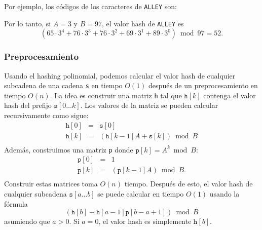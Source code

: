 Por ejemplo, los códigos de los caracteres
de \texttt{ALLEY} son:
\begin{center}
\end{center}

Por lo tanto, si $A=3$ y $B=97$, el valor hash
de \texttt{ALLEY} es
\[(65 \cdot 3^4 + 76 \cdot 3^3 + 76 \cdot 3^2 + 69 \cdot 3^1 + 89 \cdot 3^0) \bmod 97 = 52.\]

\subsubsection*{Preprocesamiento}

Usando el hashing polinomial, podemos calcular el valor hash de cualquier subcadena
de una cadena \texttt{s} en tiempo $O(1)$ después de un preprocesamiento en tiempo $O(n)$.
La idea es construir una matriz \texttt{h} tal que
$\texttt{h}[k]$ contenga el valor hash del prefijo $\texttt{s}[0 \ldots k]$.
Los valores de la matriz se pueden calcular recursivamente como sigue:
\[
\begin{array}{lcl}
\texttt{h}[0] & = & \texttt{s}[0] \\
\texttt{h}[k] & = & (\texttt{h}[k-1] A + \texttt{s}[k]) \bmod B \\
\end{array}
\]
Además, construimos una matriz \texttt{p}
donde $\texttt{p}[k]=A^k \bmod B$:
\[
\begin{array}{lcl}
\texttt{p}[0] & = & 1 \\
\texttt{p}[k] & = & (\texttt{p}[k-1] A) \bmod B. \\
\end{array}
\]
Construir estas matrices toma $O(n)$ tiempo.
Después de esto, el valor hash de cualquier subcadena
$\texttt{s}[a \ldots b]$
se puede calcular en tiempo $O(1)$ usando la fórmula
\[(\texttt{h}[b]-\texttt{h}[a-1] \texttt{p}[b-a+1]) \bmod B\]
asumiendo que $a>0$.
Si $a=0$, el valor hash es simplemente $\texttt{h}[b]$.

